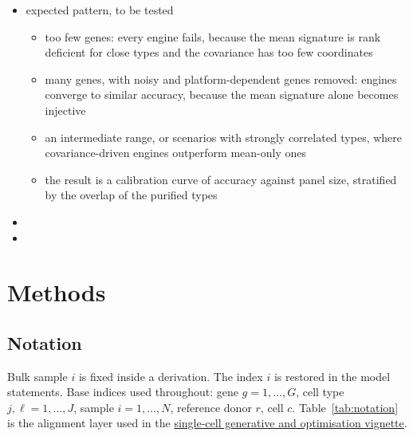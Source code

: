 \documentclass[pdflatex, sn-nature]{sn-jnl}
\theoremstyle{thmstyleone}%
\theoremstyle{thmstyletwo}%
\theoremstyle{thmstylethree}%
\newcommand{\vignette}[2]{\href{https://bastienchassagnol.github.io/DeCovarT/articles/#1}{#2}}
\begin{document}
\begin{itemize}
\begin{enumerate}
          Section~\ref{sec:cov-estimation} (graphical lasso with an
          unpenalised diagonal, de-sparsified graphical lasso, Poisson--log-normal network,
          dense shrinkage), plus the diagonal as a mean-only control
    \item single-cell to bulk alignment: the model of Section~\ref{sec:sc-tailored} against the
          population-level quadratic-weight model and the alternatives of Appendix~\ref{app:alignment}
    \item engines: DeCovarT and the comparison set, each at every panel size
  \end{enumerate}
  \item expected pattern, to be tested
  \begin{itemize}
    \item too few genes: every engine fails, because the mean signature is rank deficient for
          close types and the covariance has too few coordinates
    \item many genes, with noisy and platform-dependent genes removed: engines converge to
          similar accuracy, because the mean signature alone becomes injective
    \item an intermediate range, or scenarios with strongly correlated types, where
          covariance-driven engines outperform mean-only ones
    \item the result is a calibration curve of accuracy against panel size, stratified by
          the overlap of the purified types
  \end{itemize}
  \item[] 
  \item[] 
\end{itemize}

\section{Methods}
\label{sec:methods}

\subsection{Notation}
\label{sec:notation}

Bulk sample \(i\) is fixed inside a derivation.
The index \(i\) is restored in the model statements.
Base indices used throughout: gene \(g=1,\ldots,G\), cell type \(j,\ell=1,\ldots,J\),
sample \(i=1,\ldots,N\), reference donor \(r\), cell \(c\).
Table~\ref{tab:notation} is the alignment layer used in the
\vignette{02-1-single-cell-generative-optimisation.html}{single-cell generative and optimisation vignette}.
\end{document}
